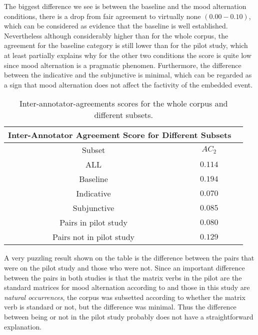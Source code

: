 The biggest difference we see is between the baseline and the mood alternation conditions, there is a drop from fair agreement to virtually none $(0.00-0.10)$, which can be considered as evidence that the baseline is well established. Nevertheless although considerably higher than for the whole corpus, the agreement for the baseline category is still lower than for the pilot study, which at least partially explains why for the other two conditions the score is quite low since mood alternation is a pragmatic phenomen. Furthermore, the difference between the indicative and the subjunctive is minimal, which can be regarded as a sign that mood alternation does not affect the factivity of the embedded event.\\

\begin{table}
\center
\begin{tabular}{|c|c|c|}
\hline
\multicolumn{2}{|c|}{Inter-Annotator Agreement Score for Different Subsets}\\\hline
                     Subset & $AC_2$\\\hline 
ALL & $0.114$\\\hline 
Baseline & $0.194$\\\hline
Indicative & $0.070$ \\\hline
Subjunctive & $ 0.085$\\\hline
Pairs in pilot study & $0.080$ \\\hline
Pairs not in pilot study & $ 0.129$\\\hline
\end{tabular}
\caption[Ac2 subsets.]{Inter-annotator-agreements scores for the whole corpus and different subsets.}
\label{tab:iaa}
\end{table}

A very puzzling result shown on the table is the difference between the pairs that were on the pilot study and those who were not. Since an important difference between the pairs in both studies is that the matrix verbs in the pilot are the standard matrices for mood alternation according to \citet{espanola2010nueva} and those in this study are \textit{natural occurrences}, the corpus was subsetted according to whether the matrix verb is standard or not, but the difference was minimal. Thus the difference between being or not in the pilot study probably does not have a straightforward explanation.\\


